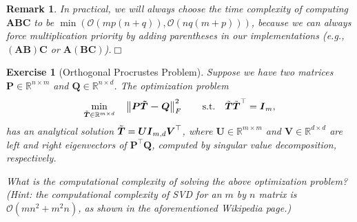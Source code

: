 \documentclass[twoside]{article}
\newcommand{\qedwhite}{\hfill \ensuremath{\Box}}
\newtheorem{remark}[theorem]{Remark}
\newtheorem{example}[theorem]{Example}
\newtheorem{exercise}[theorem]{Exercise}
\begin{document}
\begin{remark}\normalfont
    In practical, we will always choose the time complexity of computing $\boldsymbol{A}\boldsymbol{B}\boldsymbol{C}$ to be $\min(\mathcal{O}(mp(\allowbreak n+q)),\mathcal{O}(nq(m+p)))$, because we can always force multiplication priority by adding parentheses in our implementations (e.g., $(\boldsymbol{A}\boldsymbol{B})\boldsymbol{C}$ or $\boldsymbol{A}(\boldsymbol{B}\boldsymbol{C})$).\qedwhite
\end{remark}

\begin{exercise}[Orthogonal Procrustes Problem]\normalfont
Suppose we have two matrices $\boldsymbol{P} \in \mathbb{R}^{n \times m}$ and $\boldsymbol{Q} \in \mathbb{R}^{n \times d}$. The optimization problem
\begin{equation*}
\begin{aligned}
\underset{\Tilde{\boldsymbol{T}}\in\mathbb{R}^{m\times d}}{\min}\quad\left\|\boldsymbol{P}\boldsymbol{\Tilde{T}-\boldsymbol{Q}}\right\|_{F}^{2}\qquad\text{\normalfont s.t.}\quad\Tilde{\boldsymbol{T}}\Tilde{\boldsymbol{T}}^{\top} = \boldsymbol{I}_{m},
\end{aligned}
\end{equation*}
has an analytical solution $\Tilde{\boldsymbol{T}}=\boldsymbol{U}\boldsymbol{I}_{m,d}\boldsymbol{V}^{\top}$, where $\boldsymbol{U} \in \mathbb{R}^{m \times m}$ and $\boldsymbol{V} \in \mathbb{R}^{d \times d}$ are left and right eigenvectors of $\boldsymbol{P}^{\top}\boldsymbol{Q}$, computed by singular value decomposition, respectively.

    What is the computational complexity of solving the above optimization problem? (Hint: the computational complexity of SVD for an $m$ by $n$ matrix is $\mathcal{O}(mn^{2}+m^{2}n)$, as shown in the aforementioned Wikipedia page.)
\end{exercise}


\end{document}
